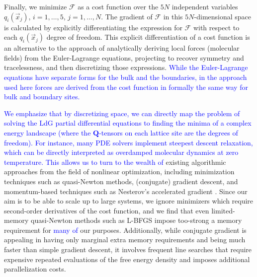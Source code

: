\documentclass[utf8]{frontiersFPHY} %
\newcommand{\DAB}[1]{\textcolor{blue}{#1}}
\newcommand{\DMS}[1]{\textcolor{blue}{#1}}
\newcommand{\Q}{\mathbf{Q}}
\begin{document}
Finally, we minimize $\mathcal{F}$ as a cost function over the $5N$ independent variables $q_i(\vec{x}_j)$, $i=1,\dots,5$, $j=1,\dots,N$. The gradient of $\mathcal{F}$ in this $5N$-dimensional space is calculated by explicitly differentiating the expression for $\mathcal{F}$ with respect to each $q_i(\vec{x}_j)$ degree of freedom. This explicit differentiation of a cost function is an alternative to the approach of analytically deriving local forces (molecular fields) from the Euler-Lagrange equations, projecting to recover symmetry and tracelessness, and then discretizing those expressions. \DAB{While the Euler-Lagrange equations have separate forms for the bulk and the boundaries, in the approach used here forces are derived from the cost function in formally the same way for bulk and boundary sites.}


\DMS{We emphasize that by discretizing space, we can directly map the problem of solving the LdG partial differential equations to finding the minima of a complex energy landscape (where the $\Q$-tensors on each lattice site are the degrees of freedom). For instance, many PDE solvers implement steepest descent relaxation, which can be directly interpreted as overdamped molecular dynamics at zero temperature. This allows us to turn to the wealth of} existing algorithmic approaches from the field of nonlinear optimization, including minimization techniques such as quasi-Newton methods, (conjugate) gradient descent, and momentum-based techniques such as Nesterov's accelerated gradient \citep{nocedal2006numerical}. Since our aim is to be able to scale up to large systems, we ignore minimizers which require second-order derivatives of the cost function, and we find that even limited-memory quasi-Newton methods such as L-BFGS impose too-strong a memory requirement for \DMS{many of} our purposes. Additionally, while conjugate gradient is appealing in having only marginal extra memory requirements and being much faster than simple gradient descent, it involves frequent line searches that require expensive repeated evaluations of the free energy density and imposes additional parallelization costs. 
\end{document}

